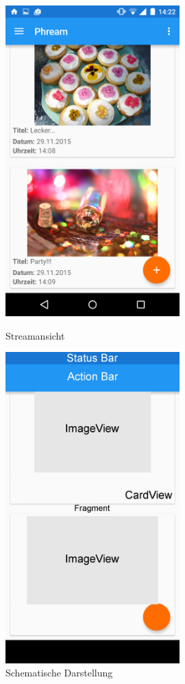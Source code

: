 \begin{figure}[H]
\centering
	\begin{minipage}{0.4\textwidth} 
	\centering
	\includegraphics[width=0.6\textwidth]{images/screenshots/streamview.png}
	\caption{Streamansicht}
	\label{label:streamview}
	\end{minipage}
	\hfill
	\begin{minipage}{0.4\textwidth}
	\centering
	\includegraphics[width=0.6\textwidth]{images/screenshots/streamview_schema.png}
	\caption{Schematische Darstellung}
	\label{label:streamview_schema}
	\end{minipage}
\end{figure}


